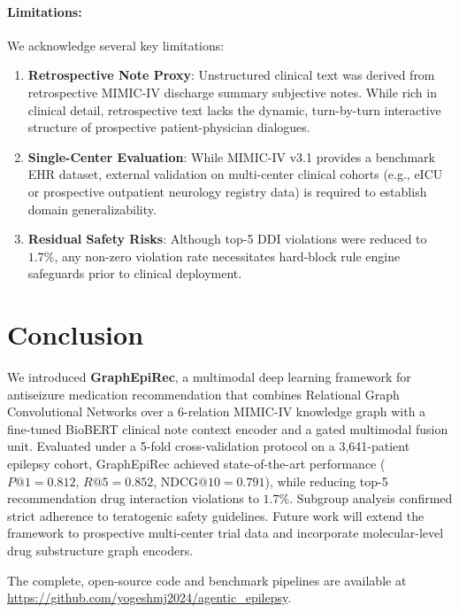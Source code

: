 \documentclass[11pt,a4paper]{article}
\begin{document}
\paragraph{Limitations:}
We acknowledge several key limitations:
\begin{enumerate}[leftmargin=*]
    \item \textbf{Retrospective Note Proxy}: Unstructured clinical text was derived from retrospective MIMIC-IV discharge summary subjective notes. While rich in clinical detail, retrospective text lacks the dynamic, turn-by-turn interactive structure of prospective patient-physician dialogues.
    \item \textbf{Single-Center Evaluation}: While MIMIC-IV v3.1 provides a benchmark EHR dataset, external validation on multi-center clinical cohorts (e.g., eICU or prospective outpatient neurology registry data) is required to establish domain generalizability.
    \item \textbf{Residual Safety Risks}: Although top-5 DDI violations were reduced to $1.7\%$, any non-zero violation rate necessitates hard-block rule engine safeguards prior to clinical deployment.
\end{enumerate}

\section{Conclusion}

We introduced \textbf{GraphEpiRec}, a multimodal deep learning framework for antiseizure medication recommendation that combines Relational Graph Convolutional Networks over a 6-relation MIMIC-IV knowledge graph with a fine-tuned BioBERT clinical note context encoder and a gated multimodal fusion unit. Evaluated under a 5-fold cross-validation protocol on a 3,641-patient epilepsy cohort, GraphEpiRec achieved state-of-the-art performance ($P@1=0.812$, $R@5=0.852$, $\text{NDCG}@10=0.791$), while reducing top-5 recommendation drug interaction violations to $1.7\%$. Subgroup analysis confirmed strict adherence to teratogenic safety guidelines. Future work will extend the framework to prospective multi-center trial data and incorporate molecular-level drug substructure graph encoders.

The complete, open-source code and benchmark pipelines are available at \url{https://github.com/yogeshmj2024/agentic_epilepsy}.
\end{document}

